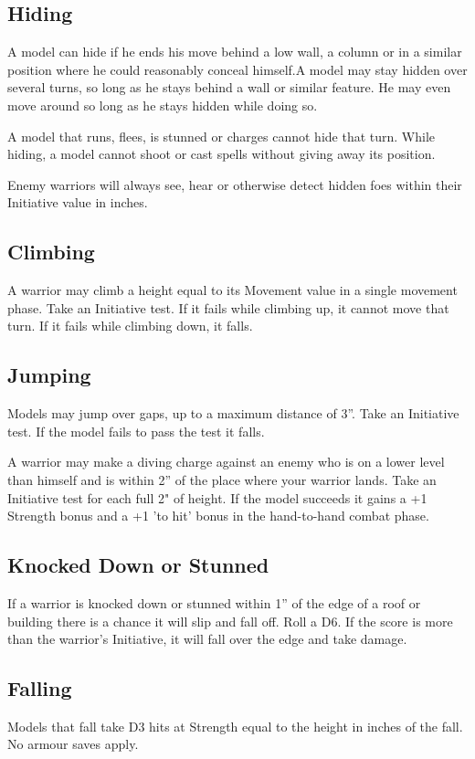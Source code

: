 \subsection*{Hiding}
A model can hide if he ends his move behind a low
wall, a column or in a similar position where he could
reasonably conceal himself.A model may stay hidden over several turns, so long
as he stays behind a wall or similar feature. He may
even move around so long as he stays hidden while
doing so.

A model that runs, flees, is stunned or charges cannot
hide that turn.
While hiding, a model cannot shoot or cast spells
without giving away its position.

Enemy warriors will always see, hear or
otherwise detect hidden foes within their Initiative
value in inches.


\subsection*{Climbing}
A warrior may climb a height equal to its Movement
value in a single movement phase. Take an Initiative
test. If it fails while climbing up, it cannot move that
turn. If it fails while climbing down, it falls.

\subsection*{Jumping}
Models may jump over gaps, up to a maximum
distance of 3”. Take an Initiative test. If the model fails to pass the test it falls.

A warrior may make a diving charge against an
enemy who is on a lower level than himself and is
within 2” of the place where your warrior lands. Take an Initiative test for each full 2" of height. If the model
succeeds it gains a +1 Strength bonus and a +1 'to
hit' bonus in the hand-to-hand combat phase.

\subsection*{Knocked Down or Stunned}
If a warrior is knocked down or stunned within 1” of
the edge of a roof or building there is a chance it
will slip and fall off. Roll a D6. If the score is more
than the warrior's Initiative, it will fall over the edge
and take damage.

\subsection*{Falling}
Models that fall take D3 hits at Strength equal to the
height in inches of the fall. No armour saves apply.

